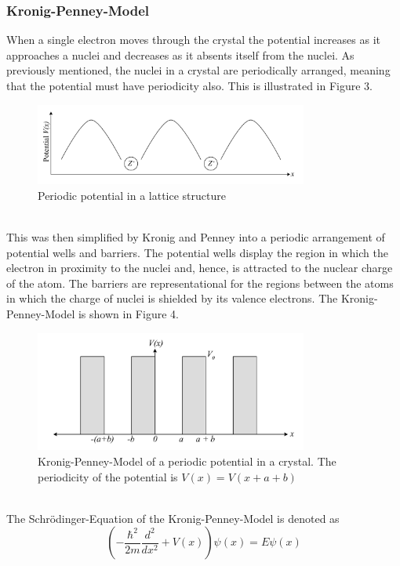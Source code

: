 \documentclass[12pt]{article}
\begin{document}
\subsubsection{Kronig-Penney-Model}
When a single electron moves through the crystal the potential increases as it approaches a nuclei and decreases as it absents itself from the nuclei. As previously mentioned, the nuclei in a crystal are periodically arranged, meaning that the potential must have periodicity also. This is illustrated in Figure 3.
\begin{figure}[hbt]
	\caption{Periodic potential in a lattice structure}
	\includegraphics[width=0.8\textwidth]{introduction/periodicpotential}	
\end{figure}
\\
This was then simplified by Kronig and Penney into a periodic arrangement of potential wells and barriers. The potential wells display the region in which the electron in proximity to the nuclei and, hence, is attracted to the nuclear charge of the atom. The barriers are representational for the regions between the atoms in which the charge of nuclei is shielded by its valence electrons. The Kronig-Penney-Model is shown in Figure 4.
\begin{figure}[hbt]
	\caption{Kronig-Penney-Model of a periodic potential in a crystal. The periodicity of the potential is $V(x) = V(x+a+b)$}
	\includegraphics[width=0.8\textwidth]{introduction/kronig_penney_model.pdf}	
\end{figure}
\\
The Schrödinger-Equation of the Kronig-Penney-Model is denoted as
\begin{equation}
		\left(-\frac{\hbar^2}{2m} \frac{d^2}{dx^2} + V(x)\right)\psi(x) = E\psi(x)
\end{equation}
\end{document}

